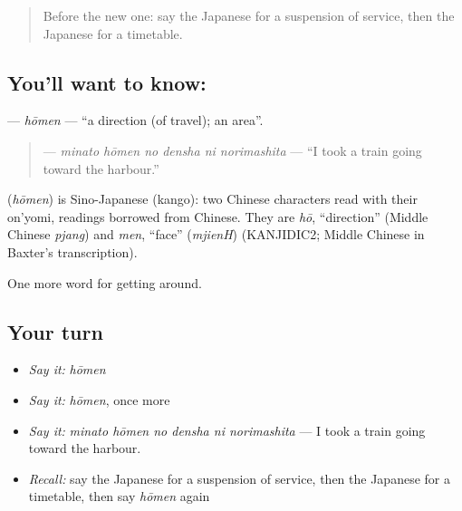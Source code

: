 \label{lesson:JA-C377-houmen}



\begin{quote}
Before the new one: say the Japanese for a suspension of service, then the Japanese for a timetable.
\end{quote}

\subsection*{You'll want to know: }
\textbf{} — \emph{hōmen} — \textquotedblleft{}a direction (of travel); an area\textquotedblright{}.

\begin{quote}
\textbf{   } — \emph{minato hōmen no densha ni norimashita} — \textquotedblleft{}I took a train going toward the harbour.\textquotedblright{}
\end{quote}

\begin{cousinweb}
\textbf{} (\emph{hōmen}) is Sino-Japanese (kango): two Chinese characters read with their on'yomi, readings borrowed from Chinese. They are \emph{hō}, \textquotedblleft{}direction\textquotedblright{} (Middle Chinese \emph{pjang}) and \emph{men}, \textquotedblleft{}face\textquotedblright{} (\emph{mjienH}) (KANJIDIC2; Middle Chinese in Baxter's transcription).
\end{cousinweb}

\begin{grammarlens}[title={What you've built}]
One more word for getting around.
\end{grammarlens}

\subsection*{Your turn}
\begin{itemize}
\raggedright
  \item \emph{Say it:} \emph{hōmen}
  \item \emph{Say it:} \emph{hōmen}, once more
  \item \emph{Say it:} \emph{minato hōmen no densha ni norimashita} — I took a train going toward the harbour.
  \item \emph{Recall:} say the Japanese for a suspension of service, then the Japanese for a timetable, then say \emph{hōmen} again
\end{itemize}

